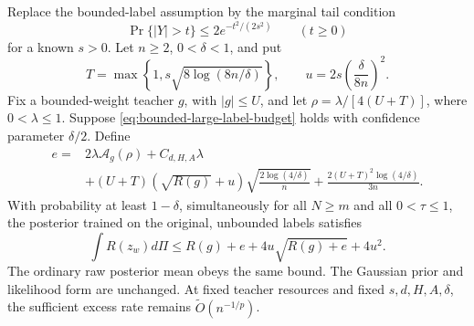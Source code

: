 \begin{corollary}
\label{cor:subgaussian-labels}
Replace the bounded-label assumption by the marginal tail condition
\begin{equation}
 \Pr\{|Y|>t\}\leq2e^{-t^2/(2s^2)}\qquad(t\geq0)
 \label{eq:subgaussian-label-tail}
\end{equation}
for a known $s>0$. Let $n\geq2$, $0<\delta<1$, and put
\[
 T=\max\left\{1,s\sqrt{8\log(8n/\delta)}\right\},
 \qquad u=2s\left(\frac\delta{8n}\right)^2.
\]
Fix a bounded-weight teacher $g$, with $|g|\leq U$, and let
$\rho=\lambda/[4(U+T)]$, where $0<\lambda\leq1$.
Suppose \eqref{eq:bounded-large-label-budget} holds with confidence
parameter $\delta/2$. Define
\begin{align*}
 e={}&2\lambda\mathcal A_g(\rho)+C_{d,H,A}\lambda\\
 &+(U+T)(\sqrt{R(g)}+u)\sqrt{\frac{2\log(4/\delta)}n}
          +\frac{2(U+T)^2\log(4/\delta)}{3n}.
\end{align*}
With probability at least $1-\delta$, simultaneously for all $N\geq m$
and all $0<\tau\leq1$, the posterior trained on the original,
unbounded labels satisfies
\begin{equation}
 \int R(z_w)d\Pi
 \leq R(g)+e+4u\sqrt{R(g)+e}+4u^2.
 \label{eq:subgaussian-label-oracle}
\end{equation}
The ordinary raw posterior mean obeys the same bound.
The Gaussian prior and likelihood form are unchanged.
At fixed teacher resources and fixed $s,d,H,A,\delta$, the sufficient
excess rate remains $\widetilde O(n^{-1/p})$.
\end{corollary}
